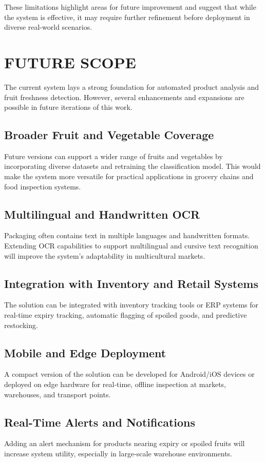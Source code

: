 \documentclass[12pt]{report}
\begin{document}
These limitations highlight areas for future improvement and suggest that while the system is effective, it may require further refinement before deployment in diverse real-world scenarios.

\section{FUTURE SCOPE}

The current system lays a strong foundation for automated product analysis and fruit freshness detection. However, several enhancements and expansions are possible in future iterations of this work.

\subsection{Broader Fruit and Vegetable Coverage}
Future versions can support a wider range of fruits and vegetables by incorporating diverse datasets and retraining the classification model. This would make the system more versatile for practical applications in grocery chains and food inspection systems.

\subsection{Multilingual and Handwritten OCR}
Packaging often contains text in multiple languages and handwritten formats. Extending OCR capabilities to support multilingual and cursive text recognition will improve the system’s adaptability in multicultural markets.

\subsection{Integration with Inventory and Retail Systems}
The solution can be integrated with inventory tracking tools or ERP systems for real-time expiry tracking, automatic flagging of spoiled goods, and predictive restocking.

\subsection{Mobile and Edge Deployment}
A compact version of the solution can be developed for Android/iOS devices or deployed on edge hardware for real-time, offline inspection at markets, warehouses, and transport points.

\subsection{Real-Time Alerts and Notifications}
Adding an alert mechanism for products nearing expiry or spoiled fruits will increase system utility, especially in large-scale warehouse environments.
\end{document}
